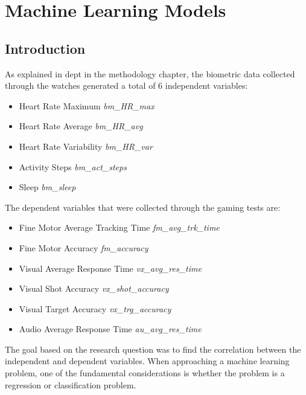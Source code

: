 \chapter{Machine Learning Models}

\section{Introduction}
As explained in dept in the methodology chapter, the biometric data collected through the watches generated a total of 6 independent variables:

\begin{itemize}
    \item Heart Rate Maximum \textit{bm\_HR\_max}
    \item Heart Rate Average \textit{bm\_HR\_avg}
    \item Heart Rate Variability \textit{bm\_HR\_var}
    \item Activity Steps \textit{bm\_act\_steps}
    \item Sleep \textit{bm\_sleep}
\end{itemize}

The dependent variables that were collected through the gaming tests are:

\begin{itemize}
    \item Fine Motor Average Tracking Time \textit{fm\_avg\_trk\_time}
    \item Fine Motor Accuracy \textit{fm\_accuracy}
    \item Visual Average Response Time \textit{vx\_avg\_res\_time}
    \item Visual Shot Accuracy \textit{vx\_shot\_accuracy}
    \item Visual Target Accuracy \textit{vx\_trg\_accuracy}
    \item Audio Average Response Time \textit{au\_avg\_res\_time}
\end{itemize}

The goal based on the research question was to find the correlation between the independent and dependent variables. When approaching a machine learning problem, one of the fundamental
considerations is whether the problem is a regression or classification problem.

